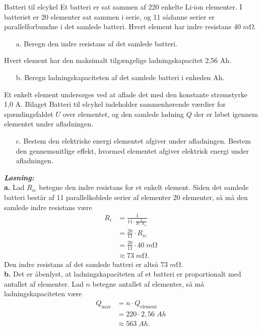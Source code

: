 \documentclass{report}
\newcommand{\sol}{\setlength{\parindent}{0cm}\textbf{\textit{Løsning:}}\setlength{\parindent}{1cm}}
\begin{document}
\begin{question}{Batteri til elcykel}{}
  Et batteri er sat sammen af 220 enkelte Li-ion elementer.
  I batteriet er 20 elementer sat sammen i serie, og 11 sådanne serier er parallelforbundne i det samlede batteri.
Hvert element har indre resistans $40 \;\unit{m\ohm}$.
\begin{itemize}
  \item[a.] Beregn den indre resistans af det samlede batteri.
\end{itemize}
Hvert element har den maksimalt tilgængelige ladningskapacitet 2,56 Ah.
\begin{itemize}
  \item[b.] Beregn ladningskapaciteten af det samlede batteri i enheden Ah.
\end{itemize}
Et enkelt element undersøges ved at aflade det med den konstante strømstyrke 1,0 A.
Bilaget Batteri til elcykel indeholder sammenhørende værdier for spændingsfaldet $U$ over elementet, og den samlede ladning $Q$ der er løbet igennem elementet under afladningen.
\begin{itemize}
  \item[c.] Bestem den elektriske energi elementet afgiver under afladningen.
Bestem den gennemsnitlige effekt, hvormed elementet afgiver elektrisk energi under afladningen.
\end{itemize}
\end{question}
\sol \\
\textbf{a.}
Lad $R_{ie}$ betegne den indre resistans for et enkelt element. 
Siden det samlede batteri består af 11 parallelkoblede serier af elementer 20 elementer, så må den samlede indre resistans være
\begin{equation*}
\begin{split}
  R_i&=\frac{1}{11 \cdot \frac{1}{20 \cdot R_{ie}}}\\
  &=\frac{20}{11} \cdot R _{ie}\\
  &=\frac{20}{11} \cdot 40 \;\unit{m\ohm} \\
  &\approx 73 \;\unit{m\ohm}.
\end{split}
\end{equation*}
Den indre resistans af det samlede batteri er altså $73 \;\unit{m\ohm} $.\\[1ex]
\textbf{b.}
Det er åbenlyst, at ladningskapaciteten af et batteri er proportionalt med antallet af elementer.
Lad $n$ betegne antallet af elementer, så må ladningskapaciteten være
\begin{equation*}
\begin{split}
  Q _{\text{max} }&=n \cdot Q _{\text{element} }\\
  &=220 \cdot 2,56 \;\unit{Ah} \\
  &\approx 563 \;\unit{Ah}.
\end{split}
\end{equation*}
\end{document}
